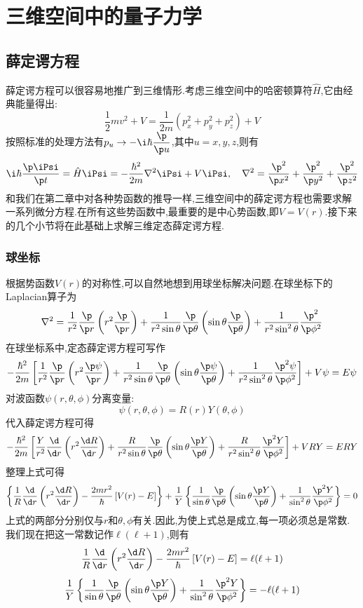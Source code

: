 \documentclass{ctexart}
\begin{document}
\section{三维空间中的量子力学}
\subsection{薛定谔方程}
薛定谔方程可以很容易地推广到三维情形.考虑三维空间中的哈密顿算符$\hat{H}$,它由经典能量得出:
\[\dfrac{1}{2}mv^2+V=\dfrac{1}{2m}\left(p_x^2+p_y^2+p_z^2\right)+V\]
按照标准的处理方法有$p_u\to-\i\hbar\dfrac{\p}{\p u}$,其中$u=x,y,z$,则有
\[\i\hbar\dfrac{\p\iPsi}{\p t}=\hat{H}\iPsi=-\dfrac{\hbar^2}{2m}\nabla^2\iPsi+V\iPsi,\quad\nabla^2=\dfrac{\p^2}{\p x^2}+\dfrac{\p^2}{\p y^2}+\dfrac{\p^2}{\p z^2}\]
和我们在第二章中对各种势函数的推导一样,三维空间中的薛定谔方程也需要求解一系列微分方程.在所有这些势函数中,最重要的是中心势函数,即$V=V(r)$.接下来的几个小节将在此基础上求解三维定态薛定谔方程.
\subsubsection{球坐标}
根据势函数$V(r)$的对称性,可以自然地想到用球坐标解决问题.在球坐标下的Laplacian算子为
\[\nabla^2=\dfrac{1}{r^2}\dfrac{\p}{\p r}\left(r^2\dfrac{\p}{\p r}\right)+\dfrac{1}{r^2\sin\theta}\dfrac{\p}{\p\theta}\left(\sin\theta\dfrac{\p}{\p\theta}\right)+\dfrac{1}{r^2\sin^2\theta}\dfrac{\p^2}{\p\phi^2}\]
在球坐标系中,定态薛定谔方程可写作
\[-\dfrac{\hbar^2}{2m}\left[\dfrac{1}{r^2}\dfrac{\p}{\p r}\left(r^2\dfrac{\p\psi}{\p r}\right)+\dfrac{1}{r^2\sin\theta}\dfrac{\p}{\p\theta}\left(\sin\theta\dfrac{\p\psi}{\p\theta}\right)+\dfrac{1}{r^2\sin^2\theta}\dfrac{\p^2\psi}{\p\phi^2}\right]+V\psi=E\psi\]
对波函数$\psi(r,\theta,\phi)$分离变量:
\[\psi(r,\theta,\phi)=R(r)Y(\theta,\phi)\]
代入薛定谔方程可得
\[-\dfrac{\hbar^2}{2m}\left[\dfrac{Y}{r^2}\dfrac{\d}{\d r}\left(r^2\dfrac{\d R}{\d r}\right)+\dfrac{R}{r^2\sin\theta}\dfrac{\p}{\p\theta}\left(\sin\theta\dfrac{\p Y}{\p\theta}\right)+\dfrac{R}{r^2\sin^2\theta}\dfrac{\p^2 Y}{\p\phi^2}\right]+VRY=ERY\]
整理上式可得
\[\left\{\dfrac{1}{R}\dfrac{\d}{\d r}\left(r^2\dfrac{\d R}{\d r}\right)-\dfrac{2mr^2}{\hbar}\left[V(r)-E\right]\right\}+\dfrac{1}{Y}\left\{\dfrac{1}{\sin\theta}\dfrac{\p}{\p\theta}\left(\sin\theta\dfrac{\p Y}{\p\theta}\right)+\dfrac{1}{\sin^2\theta}\dfrac{\p^2 Y}{\p\phi^2}\right\}=0\]
上式的两部分分别仅与$r$和$\theta,\phi$有关.因此,为使上式总是成立,每一项必须总是常数.我们现在把这一常数记作$\ell(\ell+1)$,则有
\[\dfrac{1}{R}\dfrac{\d}{\d r}\left(r^2\dfrac{\d R}{\d r}\right)-\dfrac{2mr^2}{\hbar}\left[V(r)-E\right]=\ell(\ell+1)\]
\[\dfrac{1}{Y}\left\{\dfrac{1}{\sin\theta}\dfrac{\p}{\p\theta}\left(\sin\theta\dfrac{\p Y}{\p\theta}\right)+\dfrac{1}{\sin^2\theta}\dfrac{\p^2 Y}{\p\phi^2}\right\}=-\ell(\ell+1)\]
\end{document}
